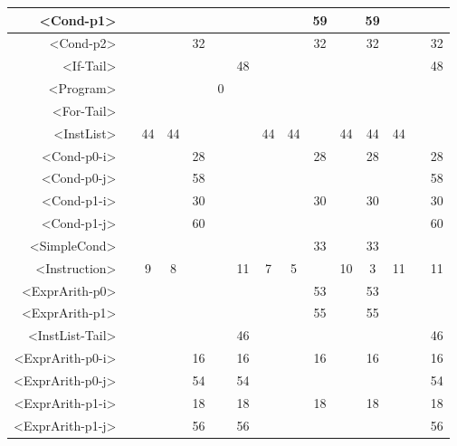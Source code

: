 \begin{tabular}{r|c@{ }c@{ }c@{ }c@{ }c@{ }c@{ }c@{ }c@{ }c@{ }c@{ }c@{ }c@{ }c@{ }c@{ }}
<Cond-p1> &   &   &   &   &   &   &   &   & 59 &   & 59 &   &   &   \\\hline
<Cond-p2> &   &   &   & 32 &   &   &   &   & 32 &   & 32 &   &   & 32 \\\hline
<If-Tail> &   &   &   &   &   & 48 &   &   &   &   &   &   &   & 48 \\\hline
<Program> &   &   &   &   & 0 &   &   &   &   &   &   &   &   &   \\\hline
<For-Tail> &   &   &   &   &   &   &   &   &   &   &   &   &   &   \\\hline
<InstList> &   & 44 & 44 &   &   &   & 44 & 44 &   & 44 & 44 & 44 &   &   \\\hline
<Cond-p0-i> &   &   &   & 28 &   &   &   &   & 28 &   & 28 &   &   & 28 \\\hline
<Cond-p0-j> &   &   &   & 58 &   &   &   &   &   &   &   &   &   & 58 \\\hline
<Cond-p1-i> &   &   &   & 30 &   &   &   &   & 30 &   & 30 &   &   & 30 \\\hline
<Cond-p1-j> &   &   &   & 60 &   &   &   &   &   &   &   &   &   & 60 \\\hline
<SimpleCond> &   &   &   &   &   &   &   &   & 33 &   & 33 &   &   &   \\\hline
<Instruction> &   & 9 & 8 &   &   & 11 & 7 & 5 &   & 10 & 3 & 11 &   & 11 \\\hline
<ExprArith-p0> &   &   &   &   &   &   &   &   & 53 &   & 53 &   &   &   \\\hline
<ExprArith-p1> &   &   &   &   &   &   &   &   & 55 &   & 55 &   &   &   \\\hline
<InstList-Tail> &   &   &   &   &   & 46 &   &   &   &   &   &   &   & 46 \\\hline
<ExprArith-p0-i> &   &   &   & 16 &   & 16 &   &   & 16 &   & 16 &   &   & 16 \\\hline
<ExprArith-p0-j> &   &   &   & 54 &   & 54 &   &   &   &   &   &   &   & 54 \\\hline
<ExprArith-p1-i> &   &   &   & 18 &   & 18 &   &   & 18 &   & 18 &   &   & 18 \\\hline
<ExprArith-p1-j> &   &   &   & 56 &   & 56 &   &   &   &   &   &   &   & 56 \\\hline
\end{tabular}



